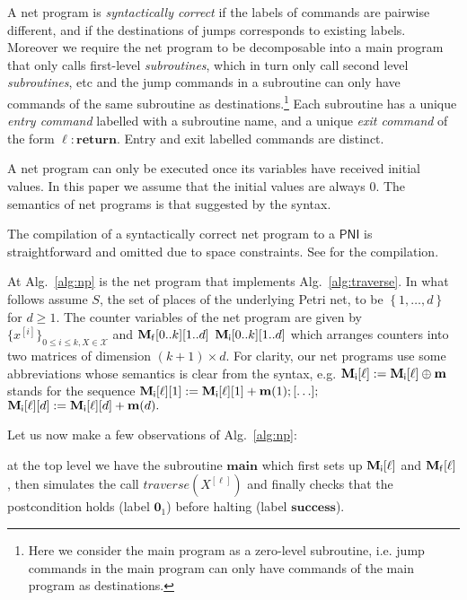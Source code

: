 \documentclass{fsttcs}
\def\set#1{{\left\{ #1 \right\}}}
\def\mmap{\mathbf{m}}
\def\pni{\mathsf{PNI}}
\begin{document}
\medskip

A net program is \emph{syntactically correct} if the labels of commands are
pairwise different, and if the destinations of jumps corresponds to existing
labels. Moreover we require the net program to be decomposable into a main
program that only calls first-level \emph{subroutines}, which in turn only call
second level \emph{subroutines}, etc and the jump commands in a subroutine can
only have commands of the same subroutine as destinations.\footnote{Here we
consider the main program as a zero-level subroutine, i.e. jump commands in the
main program can only have commands of the main program as destinations.} Each
subroutine has a unique \emph{entry command} labelled with a subroutine name,
and a unique \emph{exit command} of the form \(\ell\colon\mathbf{return}\).
Entry and exit labelled commands are distinct. 


A net program can only be executed once its variables have received initial
values. In this paper we assume that the initial values are always \(0\).
The semantics of net programs is that suggested by the syntax. 

The compilation of a syntactically correct net program to a \(\pni\) is
straightforward and omitted due to space constraints. See \cite{esparza-course}
for the compilation.



At Alg.~\ref{alg:np} is the net program that implements
Alg.~\ref{alg:traverse}.  In what follows assume \(S\), the set of places of
the underlying Petri net, to be \(\set{1,\ldots,d}\) for \(d\geq 1\).  The
counter variables of the net program are given by \(\{x^{[i]}\}_{0\leq i\leq
k, X\in\mathcal{X}}\) and \(\mathbf{M}_{\sf f}[0..k][1..d]\) \(\mathbf{M}_{\sf
i}[0..k][1..d]\) which arranges counters into two matrices of dimension \(
(k+1)\times d\).  For clarity, our net programs use some abbreviations whose
semantics is clear from the syntax, e.g.  \(\mathbf{M}_{\sf
i}[\ell]:=\mathbf{M}_{\sf i}[\ell]\oplus\mmap\) stands for the sequence
\(\mathbf{M}_{\sf i}[\ell][1]:=\mathbf{M}_{\sf i}[\ell][1]+\mmap(1);
[\ldots];\) \( \mathbf{M}_{\sf i}[\ell][d]:=\mathbf{M}_{\sf
i}[\ell][d]+\mmap(d).\)

Let us now make a few observations of Alg.~\ref{alg:np}:

\noindent \textbullet{} at the top level we have the subroutine \(\mathbf{main}\) which first sets up
	\(\mathbf{M}_{\sf i}[\ell]\) and \(\mathbf{M}_{\sf f}[\ell]\),
	then simulates the call \(\mathit{traverse}(X^{[\ell]})\) and finally checks
	that the postcondition holds (label \(\boldsymbol{0}_{1}\)) before halting (label \(\mathbf{success}\)). 
\end{document}
